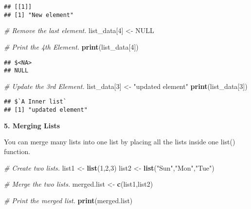 \documentclass[
]{article}
\newenvironment{Shaded}{\begin{snugshade}}{\end{snugshade}}
\newcommand{\CommentTok}[1]{\textcolor[rgb]{0.56,0.35,0.01}{\textit{#1}}}
\newcommand{\ConstantTok}[1]{\textcolor[rgb]{0.56,0.35,0.01}{#1}}
\newcommand{\DecValTok}[1]{\textcolor[rgb]{0.00,0.00,0.81}{#1}}
\newcommand{\FunctionTok}[1]{\textcolor[rgb]{0.13,0.29,0.53}{\textbf{#1}}}
\newcommand{\NormalTok}[1]{#1}
\newcommand{\OtherTok}[1]{\textcolor[rgb]{0.56,0.35,0.01}{#1}}
\newcommand{\StringTok}[1]{\textcolor[rgb]{0.31,0.60,0.02}{#1}}
\begin{document}
\begin{verbatim}
## [[1]]
## [1] "New element"
\end{verbatim}

\begin{Shaded}
\begin{Highlighting}[]
\CommentTok{\# Remove the last element.}
\NormalTok{list\_data[}\DecValTok{4}\NormalTok{] }\OtherTok{\textless{}{-}} \ConstantTok{NULL}

\CommentTok{\# Print the 4th Element.}
\FunctionTok{print}\NormalTok{(list\_data[}\DecValTok{4}\NormalTok{])}
\end{Highlighting}
\end{Shaded}

\begin{verbatim}
## $<NA>
## NULL
\end{verbatim}

\begin{Shaded}
\begin{Highlighting}[]
\CommentTok{\# Update the 3rd Element.}
\NormalTok{list\_data[}\DecValTok{3}\NormalTok{] }\OtherTok{\textless{}{-}} \StringTok{"updated element"}
\FunctionTok{print}\NormalTok{(list\_data[}\DecValTok{3}\NormalTok{])}
\end{Highlighting}
\end{Shaded}

\begin{verbatim}
## $`A Inner list`
## [1] "updated element"
\end{verbatim}

\textbf{5. Merging Lists}

You can merge many lists into one list by placing all the lists inside
one list() function.

\begin{Shaded}
\begin{Highlighting}[]
\CommentTok{\# Create two lists.}
\NormalTok{list1 }\OtherTok{\textless{}{-}} \FunctionTok{list}\NormalTok{(}\DecValTok{1}\NormalTok{,}\DecValTok{2}\NormalTok{,}\DecValTok{3}\NormalTok{)}
\NormalTok{list2 }\OtherTok{\textless{}{-}} \FunctionTok{list}\NormalTok{(}\StringTok{"Sun"}\NormalTok{,}\StringTok{"Mon"}\NormalTok{,}\StringTok{"Tue"}\NormalTok{)}

\CommentTok{\# Merge the two lists.}
\NormalTok{merged.list }\OtherTok{\textless{}{-}} \FunctionTok{c}\NormalTok{(list1,list2)}

\CommentTok{\# Print the merged list.}
\FunctionTok{print}\NormalTok{(merged.list)}
\end{Highlighting}
\end{Shaded}
\end{document}
